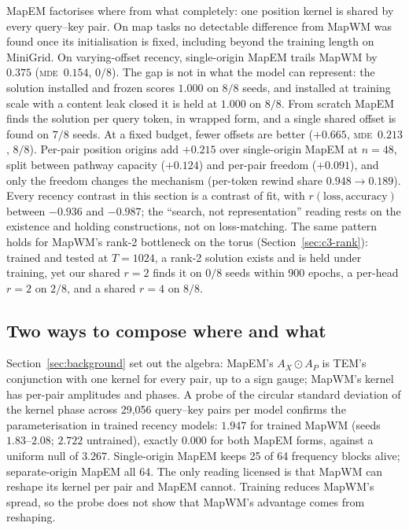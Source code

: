\documentclass[10pt]{article}
\newcommand{\mde}{\textsc{mde}}
\begin{document}
MapEM factorises where from what completely: one position kernel is shared by every query--key pair.
On map tasks no detectable difference from MapWM was found once its initialisation is fixed, including
beyond the training length on MiniGrid. On varying-offset recency, single-origin
MapEM trails MapWM by $0.375$ (\mde\ $0.154$, $0/8$). The gap is not in what the model can represent: the
solution installed and frozen scores $1.000$ on $8/8$ seeds, and installed at training scale with a
content leak closed it is held at $1.000$ on $8/8$. From scratch MapEM finds the solution per query
token, in wrapped form, and a single shared offset is found on $7/8$ seeds. At a fixed budget, fewer
offsets are better ($+0.665$, \mde\ $0.213$, $8/8$). Per-pair position origins add $+0.215$ over single-origin MapEM at
$n=48$, split between pathway capacity ($+0.124$) and per-pair freedom ($+0.091$), and only the freedom
changes the mechanism (per-token rewind share $0.948\to0.189$). Every recency contrast in this section is a
contrast of fit, with $r(\text{loss},\text{accuracy})$ between $-0.936$ and $-0.987$; the
``search, not representation'' reading rests on the existence and holding constructions, not on
loss-matching. The same pattern holds for MapWM's rank-2 bottleneck on the torus
(Section~\ref{sec:c3-rank}): trained and tested at $T=1024$, a rank-2 solution exists and is held under
training, yet our shared $r=2$ finds it on $0/8$ seeds within 900 epochs, a per-head $r=2$ on
$2/8$, and a shared $r=4$ on $8/8$.

\subsection{Two ways to compose where and what}
\label{sec:c4-compose}

Section~\ref{sec:background} set out the algebra: MapEM's $A_X\odot A_P$ is TEM's conjunction with one
kernel for every pair, up to a sign gauge; MapWM's kernel has per-pair amplitudes and phases. A probe of
the circular standard deviation of the kernel phase across 29,056 query--key pairs per model confirms the
parameterisation in trained recency models: $1.947$ for trained MapWM (seeds $1.83$--$2.08$; $2.722$
untrained), exactly $0.000$ for both MapEM forms, against a uniform null of $3.267$. Single-origin MapEM
keeps 25 of 64 frequency blocks alive; separate-origin MapEM all 64. The only reading licensed is that
MapWM can reshape its kernel per pair and MapEM cannot. Training reduces MapWM's spread, so the probe does
not show that MapWM's advantage comes from reshaping. %
\end{document}
